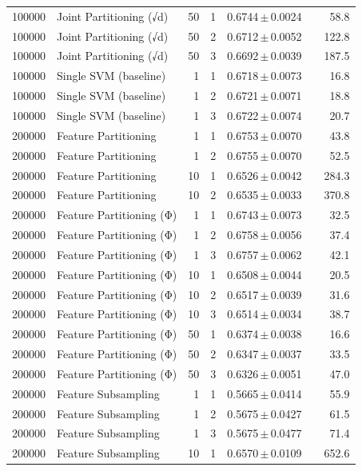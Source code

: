 \begin{table}[ht]
\begin{tabular}{rlrrccr}
100000 & Joint Partitioning (√d) & 50 & 1 & 0.6744\,$\pm$\,0.0024 &  & 58.8 \\
100000 & Joint Partitioning (√d) & 50 & 2 & 0.6712\,$\pm$\,0.0052 &  & 122.8 \\
100000 & Joint Partitioning (√d) & 50 & 3 & 0.6692\,$\pm$\,0.0039 &  & 187.5 \\
100000 & Single SVM (baseline) & 1 & 1 & 0.6718\,$\pm$\,0.0073 &  & 16.8 \\
100000 & Single SVM (baseline) & 1 & 2 & 0.6721\,$\pm$\,0.0071 &  & 18.8 \\
100000 & Single SVM (baseline) & 1 & 3 & 0.6722\,$\pm$\,0.0074 &  & 20.7 \\
200000 & Feature Partitioning & 1 & 1 & 0.6753\,$\pm$\,0.0070 &  & 43.8 \\
200000 & Feature Partitioning & 1 & 2 & 0.6755\,$\pm$\,0.0070 &  & 52.5 \\
200000 & Feature Partitioning & 10 & 1 & 0.6526\,$\pm$\,0.0042 &  & 284.3 \\
200000 & Feature Partitioning & 10 & 2 & 0.6535\,$\pm$\,0.0033 &  & 370.8 \\
200000 & Feature Partitioning (Φ) & 1 & 1 & 0.6743\,$\pm$\,0.0073 &  & 32.5 \\
200000 & Feature Partitioning (Φ) & 1 & 2 & 0.6758\,$\pm$\,0.0056 &  & 37.4 \\
200000 & Feature Partitioning (Φ) & 1 & 3 & 0.6757\,$\pm$\,0.0062 &  & 42.1 \\
200000 & Feature Partitioning (Φ) & 10 & 1 & 0.6508\,$\pm$\,0.0044 &  & 20.5 \\
200000 & Feature Partitioning (Φ) & 10 & 2 & 0.6517\,$\pm$\,0.0039 &  & 31.6 \\
200000 & Feature Partitioning (Φ) & 10 & 3 & 0.6514\,$\pm$\,0.0034 &  & 38.7 \\
200000 & Feature Partitioning (Φ) & 50 & 1 & 0.6374\,$\pm$\,0.0038 &  & 16.6 \\
200000 & Feature Partitioning (Φ) & 50 & 2 & 0.6347\,$\pm$\,0.0037 &  & 33.5 \\
200000 & Feature Partitioning (Φ) & 50 & 3 & 0.6326\,$\pm$\,0.0051 &  & 47.0 \\
200000 & Feature Subsampling & 1 & 1 & 0.5665\,$\pm$\,0.0414 &  & 55.9 \\
200000 & Feature Subsampling & 1 & 2 & 0.5675\,$\pm$\,0.0427 &  & 61.5 \\
200000 & Feature Subsampling & 1 & 3 & 0.5675\,$\pm$\,0.0477 &  & 71.4 \\
200000 & Feature Subsampling & 10 & 1 & 0.6570\,$\pm$\,0.0109 &  & 652.6 \\

\end{tabular}
\end{table}
